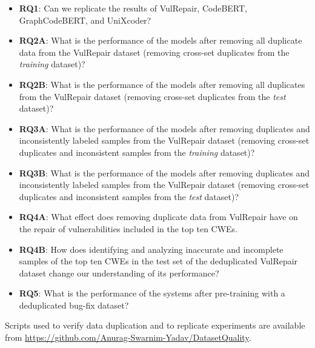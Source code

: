\begin{itemize}
\item {\textbf{RQ1}}: Can we replicate the results of VulRepair, CodeBERT, GraphCodeBERT, and UniXcoder?

\item {\textbf{RQ2A}}: What is the performance of the models after removing all duplicate data from the VulRepair dataset (removing cross-set duplicates from the \emph{training} dataset)?

\item {\textbf{RQ2B}}: What is the performance of the models after removing all duplicates from the VulRepair dataset (removing cross-set duplicates from the \emph{test} dataset)?

\item {\textbf{RQ3A}}: What is the performance of the models after removing duplicates and inconsistently labeled samples from the VulRepair dataset (removing cross-set duplicates and inconsistent samples from the \emph{training} dataset)?

\item {\textbf{RQ3B}}: What is the performance of the models after removing duplicates and inconsistently labeled samples from the VulRepair dataset (removing cross-set duplicates and inconsistent samples from the \emph{test} dataset)?

\item{\textbf{RQ4A}}: What effect does removing duplicate data from VulRepair have on the repair of vulnerabilities included in the top ten CWEs.


\item {\textbf{RQ4B}}: How does identifying and analyzing inaccurate and incomplete samples of the top ten CWEs in the test set of the deduplicated VulRepair dataset change our understanding of its performance?


\item {\textbf{RQ5}}: What is the performance of the systems after pre-training with a deduplicated bug-fix dataset?

\end{itemize}

Scripts used to verify data duplication and to replicate experiments are available from \href{https://github.com/Anurag-Swarnim-Yadav/DatasetQuality}{https://github.com/Anurag-Swarnim-Yadav/DatasetQuality}.


